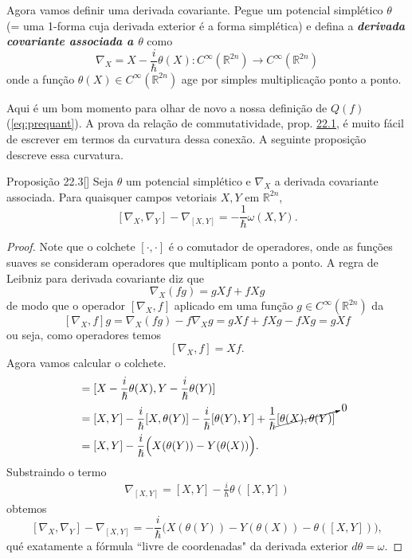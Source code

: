 Agora vamos definir uma derivada covariante. Pegue um potencial simplético $\theta$ (= uma 1-forma cuja derivada exterior é a forma simplética) e defina a \textit{\textbf{derivada covariante associada a $\theta$}} como
\[\nabla_X=X-\frac{i}{\hslash}\theta(X):C^\infty(\mathbb{R}^{2n})\longrightarrow C^\infty(\mathbb{R}^{2n})\]
onde a função $\theta(X)\in C^\infty(\mathbb{R}^{2n})$ age por simples multiplicação ponto a ponto. 

Aqui é um bom momento para olhar de novo a nossa definição de $Q(f)$ (\cref{eq:prequant}). A prova da relação de commutatividade, prop. \hyperref[prop:22.1]{22.1}, é muito fácil de escrever em termos da curvatura dessa conexão. A seguinte proposição descreve essa curvatura.

\begin{thing4}{Proposição 22.3}[\cite{hallq}]\leavevmode
	Seja $\theta$ um potencial simplético e $\nabla_X$ a derivada covariante associada. Para quaisquer campos vetoriais $X,Y$ em  $\mathbb{R}^{2n}$,
	\[[\nabla_X,\nabla_Y]-\nabla_{[X,Y]}=-\frac{1}{\hslash}\omega(X,Y).\]
\end{thing4}

\begin{proof}\leavevmode
	Note que o colchete $[\cdot,\cdot]$ é o comutador de operadores, onde as funções suaves se consideram operadores que multiplicam ponto a ponto. A regra de Leibniz para derivada covariante diz que
	\[\nabla_X(fg)=gXf+fXg\]
	de modo que o operador $[\nabla_X,f]$ aplicado em uma função $g\in C^\infty(\mathbb{R}^{2n})$ da
\[[\nabla_X,f]g=\nabla_X(fg)-f \nabla_Xg=gXf+fXg-fXg=gXf\]
ou seja, como operadores temos
\[[\nabla_X,f]=Xf.\]
Agora vamos calcular o colchete.
\begin{align*}
	[\nabla_X,\nabla_Y]&=[X-\frac{i}{\hslash}\theta(X),Y-\frac{i}{\hslash}\theta(Y)]\\
			   &=[X,Y]-\frac{i}{\hslash}[X,\theta(Y)]-\frac{i}{\hslash}[\theta(Y),Y]+\frac{1}{\hslash}\cancelto{0}{[\theta(X),\theta(Y)]}\\
			   &=[X,Y]-\frac{i}{\hslash}\Big(X(\theta(Y))-Y(\theta(X))\Big).
\end{align*}
Substraindo o termo
\begin{align*}
	\nabla_{[X,Y]}=[X,Y]-\frac{i}{\hslash}\theta([X,Y])
\end{align*}
obtemos
\[[\nabla_X,\nabla_Y]-\nabla_{[X,Y]}=-\frac{i}{\hslash}\Big(X(\theta(Y))-Y(\theta(X))-\theta([X,Y])\Big),\]
qué exatamente a fórmula ``livre de coordenadas" da derivada exterior $d\theta=\omega$.
\end{proof}

